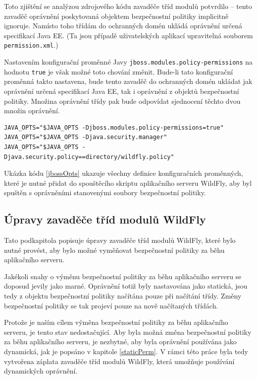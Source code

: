 Toto zjištění se analýzou zdrojového kódu zavaděče tříd modulů potvrdilo -- tento zavaděč oprávnění poskytovaná objektem bezpečnostní politiky implicitně ignoruje.
Namísto toho třídám do ochranných domén ukládá oprávnění určená specifikací Java EE. \cite{javaEEspec}
(Ta jsou případě uživatelských aplikací upravitelná souborem {\tt permission.xml}.)

Nastavením konfigurační proměnné Javy {\tt jboss.modules.policy-permissions} na hodnotu {\tt true} je však možné toto chování změnit.
Bude-li tato konfigurační proměnná takto nastavena, bude tento zavaděč do ochranných domén ukládat jak oprávnění určená specifikací Java EE, tak i oprávnění z objektů bezpečnostní politiky.
Množina oprávnění třídy pak bude odpovídat sjednocení těchto dvou množin oprávnění.
\cite{sourceModuleClassLoader}

\begin{lstlisting}[caption=Úprava spouštěcího skriptu pro spuštění se souborem bezpečnostní politiky, label=jbossOpts]
JAVA_OPTS="$JAVA_OPTS -Djboss.modules.policy-permissions=true"
JAVA_OPTS="$JAVA_OPTS -Djava.security.manager"
JAVA_OPTS="$JAVA_OPTS -Djava.security.policy==directory/wildfly.policy"
\end{lstlisting}

Ukázka kódu \ref{jbossOpts} ukazuje všechny definice konfiguračních proměnných, které je nutné přidat do spouštěcího skriptu aplikačního serveru WildFly,
aby byl spuštěn s oprávněními stanovenými soubory bezpečnostní politiky.

\subsection{Úpravy zavaděče tříd modulů WildFly} \label{zmenaZaBehu}

Tato podkapitola popisuje úpravy zavaděče tříd modulů WildFly, které bylo nutné provést, aby bylo možné vyměňovat bezpečnostní politiky za běhu aplikačního serveru.

Jakékoli snahy o výměnu bezpečnostní politiky za běhu aplikačního serveru se doposud jevily jako marné. Oprávnění totiž byly nastavována jako statická,
jsou tedy z objektu bezpečnostní politiky načítána pouze při načítání třídy. Změny bezpečnostní politiky se tak projeví pouze na nově načítaných třídách.

Protože je naším cílem výměna bezpečnostní politiky za běhu aplikačního serveru, je tento stav nedostačující.
Aby byla možná změna bezpečnostní politiky za běhu aplikačního serveru, je nezbytné, aby byla oprávnění používána jako dynamická, jak je popsáno v kapitole \ref{staticPerm}.
V rámci této práce byla tedy vytvořena záplata zavaděče tříd modulů WildFly, která umožňuje používání dynamických oprávnění.

